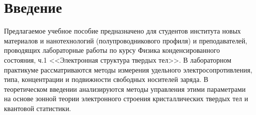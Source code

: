 \setcounter{chapter}{-1}
\chapter{Введение}

Предлагаемое учебное пособие предназначено для студентов института новых материалов и нанотехнологий (полупроводникового профиля) и преподавателей, проводящих лабораторные работы по курсу Физика конденсированного состояния, ч.1 <<Электронная структура твердых тел>>. В лабораторном практикуме рассматриваются методы измерения удельного электросопротивления, типа, концентрации и подвижности свободных носителей заряда. В теоретическом введении анализируются методы управления этими параметрами на основе зонной теории электронного строения кристаллических твердых тел и квантовой статистики.